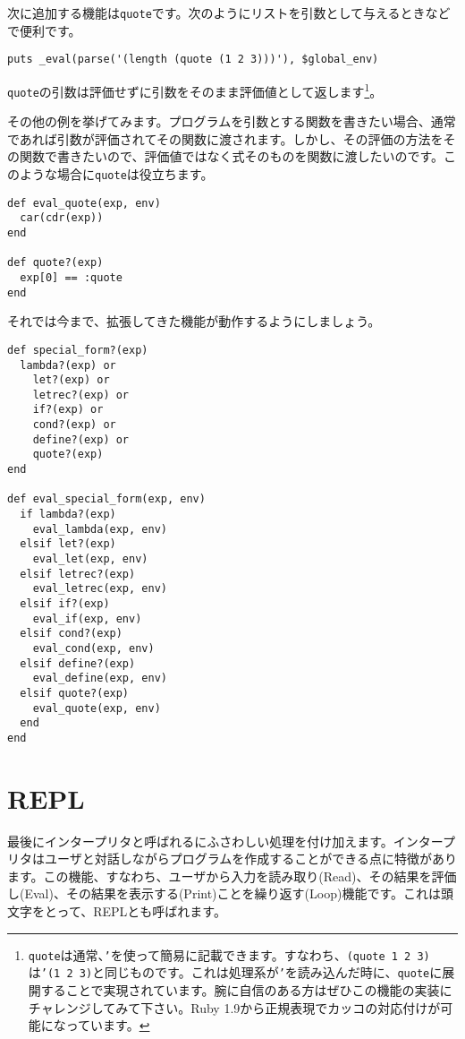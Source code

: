 次に追加する機能は{\tt quote}です。次のようにリストを引数として与えるときなどで便利です。

\begin{lstlisting}
puts _eval(parse('(length (quote (1 2 3)))'), $global_env)
\end{lstlisting}

{\tt quote}の引数は評価せずに引数をそのまま評価値として返します\footnote{{\tt quote}は通常、{\tt '}を使って簡易に記載できます。すなわち、{\tt (quote 1 2 3)}は{\tt '(1 2 3)}と同じものです。これは処理系が{\tt '}を読み込んだ時に、{\tt quote}に展開することで実現されています。腕に自信のある方はぜひこの機能の実装にチャレンジしてみて下さい。Ruby 1.9から正規表現でカッコの対応付けが可能になっています。}。

その他の例を挙げてみます。プログラムを引数とする関数を書きたい場合、通常であれば引数が評価されてその関数に渡されます。しかし、その評価の方法をその関数で書きたいので、評価値ではなく式そのものを関数に渡したいのです。このような場合に{\tt quote}は役立ちます。

\begin{lstlisting}
def eval_quote(exp, env)
  car(cdr(exp))
end

def quote?(exp)
  exp[0] == :quote
end
\end{lstlisting}

それでは今まで、拡張してきた機能が動作するようにしましょう。

\begin{lstlisting}
def special_form?(exp)
  lambda?(exp) or 
    let?(exp) or 
    letrec?(exp) or 
    if?(exp) or 
    cond?(exp) or 
    define?(exp) or 
    quote?(exp)
end

def eval_special_form(exp, env)
  if lambda?(exp)
    eval_lambda(exp, env)
  elsif let?(exp)
    eval_let(exp, env)
  elsif letrec?(exp)
    eval_letrec(exp, env)
  elsif if?(exp)
    eval_if(exp, env)
  elsif cond?(exp)
    eval_cond(exp, env)
  elsif define?(exp)
    eval_define(exp, env)
  elsif quote?(exp)
    eval_quote(exp, env)
  end
end
\end{lstlisting}

\section{REPL}

最後にインタープリタと呼ばれるにふさわしい処理を付け加えます。インタープリタはユーザと対話しながらプログラムを作成することができる点に特徴があります。この機能、すなわち、ユーザから入力を読み取り(Read)、その結果を評価し(Eval)、その結果を表示する(Print)ことを繰り返す(Loop)機能です。これは頭文字をとって、REPLとも呼ばれます。

